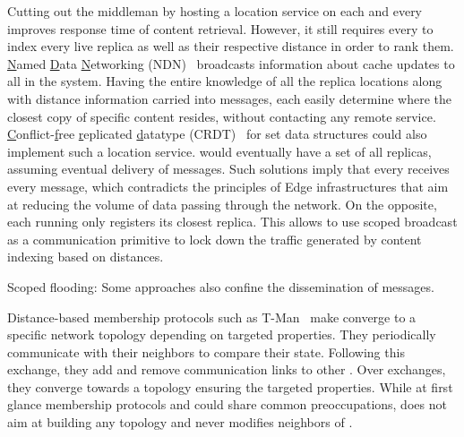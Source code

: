 \begin{asparadesc}
Cutting out the middleman by hosting a location service on each and
every \process improves response time of content retrieval. However,
it still requires every \process to index every live replica as well
as their respective distance in order to rank them.
\underline{N}amed \underline{D}ata \underline{N}etworking
(NDN)~\cite{nlsr} broadcasts information about cache updates to all
\nodes in the system. Having the entire knowledge of all the replica
locations along with distance information carried into messages, each
\node easily determine where the closest copy of specific content
resides, without contacting any remote
service. \underline{C}onflict-\underline{f}ree \underline{r}eplicated
\underline{d}atatype (CRDT)~\cite{shapiro2011crdts} for set data
structures could also implement such a location service. \Processes
would eventually have a set of all replicas, assuming eventual
delivery of messages.
\noindent Such solutions imply that every \process receives every
message, which contradicts the principles of Edge infrastructures that
aim at reducing the volume of data passing through the network. On the
opposite, each \process running \NAME only registers its closest
replica. This allows \NAME to use scoped broadcast as a communication
primitive to lock down the traffic generated by content indexing based
on distances.

\item [Scoped flooding:]
  Some approaches also confine the dissemination of messages.

\noindent Distance-based membership protocols such as
T-Man~\cite{t-man} make \processes converge to a specific network
topology depending on targeted properties. They periodically
communicate with their neighbors to compare their state. Following
this exchange, they add and remove communication links to other
\processes. Over exchanges, they converge towards a topology ensuring
the targeted properties.  While at first glance membership protocols
and \NAME could share common preoccupations, \NAME does not aim at
building any topology and never modifies neighbors of \processes.



\end{asparadesc}
